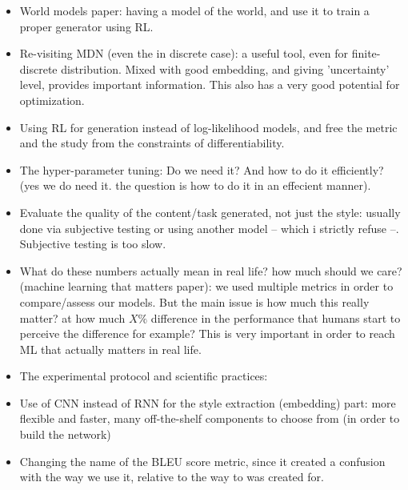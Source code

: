 \begin{itemize}
    \item World models paper: having a model of the world, and use it to train a proper generator using RL.

    \item Re-visiting MDN (even the in discrete case): a useful tool, even for finite-discrete distribution. Mixed with good embedding, and giving 'uncertainty' level, provides important information. This also has a very good potential for optimization.

    \item Using RL for generation instead of log-likelihood models, and free the metric and the study from the constraints of differentiability.
    \item The hyper-parameter tuning: Do we need it? And how to do it efficiently? (yes we do need it. the question is how to do it in an effecient manner).

    \item Evaluate the quality of the content/task generated, not just the style: usually done via subjective testing or using another model -- which i strictly refuse --. Subjective testing is too slow.

    \item What do these numbers actually mean in real life? how much should we care? \cite{wagstaff2012machine} (machine learning that matters paper): we used multiple metrics in order to compare/assess our models. But the main issue is how much this really matter? at how much $X\%$ difference in the performance that humans start to perceive the difference for example? This is very important in order to reach ML that actually matters in real life.

    \item The experimental protocol and scientific practices:

    \item Use of CNN instead of RNN for the style extraction (embedding) part: more flexible and faster, many off-the-shelf components to choose from (in order to build the network)

    \item Changing the name of the BLEU score metric, since it created a confusion with the way we use it, relative to the way to was created for.
\end{itemize}
